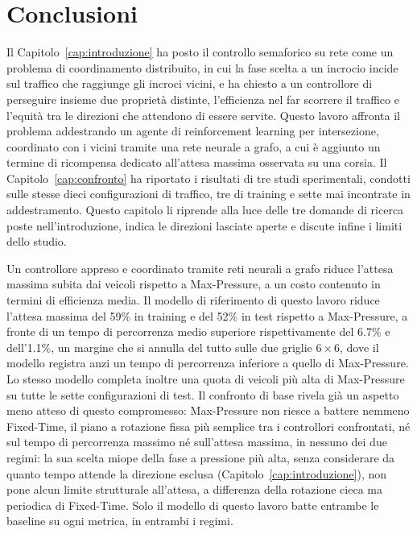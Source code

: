 \chapter{Conclusioni}
\label{cap:conclusioni}

Il Capitolo~\ref{cap:introduzione} ha posto il controllo semaforico su rete
come un problema di coordinamento distribuito, in cui la fase scelta a un
incrocio incide sul traffico che raggiunge gli incroci vicini, e ha
chiesto a un controllore di perseguire insieme due proprietà distinte,
l'efficienza nel far scorrere il traffico e l'equità tra le direzioni che
attendono di essere servite. Questo lavoro affronta il problema
addestrando un agente di reinforcement learning per intersezione,
coordinato con i vicini tramite una rete neurale a grafo, a cui è
aggiunto un termine di ricompensa dedicato all'attesa massima osservata
su una corsia. Il Capitolo~\ref{cap:confronto} ha riportato i risultati
di tre studi sperimentali, condotti sulle stesse dieci configurazioni di
traffico, tre di training e sette mai incontrate in addestramento.
Questo capitolo li riprende alla luce delle tre domande di ricerca poste
nell'introduzione, indica le direzioni lasciate aperte e discute infine i
limiti dello studio.

Un controllore appreso e coordinato tramite reti neurali a grafo riduce
l'attesa massima subita dai veicoli rispetto a Max-Pressure, a un costo
contenuto in termini di efficienza media. Il modello di riferimento di
questo lavoro riduce l'attesa massima del 59\% in training e del 52\% in
test rispetto a Max-Pressure, a fronte di un tempo di percorrenza medio
superiore rispettivamente del 6.7\% e dell'1.1\%, un margine che si
annulla del tutto sulle due griglie $6\times6$, dove il modello registra
anzi un tempo di percorrenza inferiore a quello di Max-Pressure. Lo
stesso modello completa inoltre una quota di veicoli più alta di
Max-Pressure su tutte le sette configurazioni di test. Il confronto di
base rivela già un aspetto meno atteso di questo compromesso:
Max-Pressure non riesce a battere nemmeno Fixed-Time, il piano a
rotazione fissa più semplice tra i controllori confrontati, né sul tempo
di percorrenza massimo né sull'attesa massima, in nessuno dei due regimi:
la sua scelta miope della fase a pressione più alta, senza considerare da
quanto tempo attende la direzione esclusa (Capitolo~\ref{cap:introduzione}),
non pone alcun limite strutturale all'attesa, a differenza della
rotazione cieca ma periodica di Fixed-Time. Solo il modello di questo
lavoro batte entrambe le baseline su ogni metrica, in entrambi i regimi.

